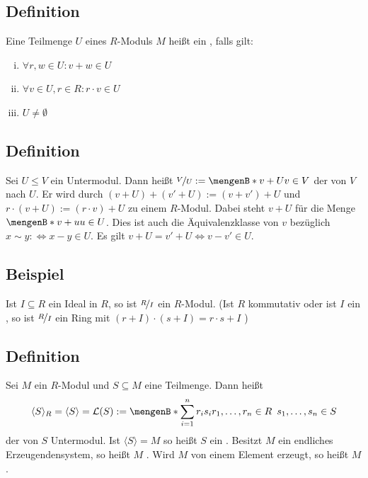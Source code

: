 \subsection[Definition: Untermodul]{Definition} %
\label{sub:143}
Eine Teilmenge $U$ eines $R$-Moduls $M$ heißt ein , falls gilt:
\begin{enumerate}[(i)]
	\item $\forall r,w \in U : v+w \in U$
	\item $\forall v \in U, r \in R : r \cdot v \in U$
	\item $U \not= \emptyset$
\end{enumerate} 

\subsection[Definition: Quotientenmodul]{Definition} %
\label{sub:144}
Sei $U \le V$ ein Untermodul. Dann heißt $\nicefrac{V}{U} := \set[v+U]{v \in V} $ der  von $V$ nach $U$. Er wird durch 
$(v+U)+ (v'+U) := (v+v')+U$ und $r \cdot (v +U) := (r \cdot v) +U$ zu einem $R$-Modul. Dabei steht $v+U$ für die Menge $ \set[v+u]{u \in U} $. Dies ist auch die Äquivalenzklasse von $v$
bezüglich $x \sim y :\Leftrightarrow x-y \in U$. Es gilt $v+U = v' +U \iff v-v' \in U$.

\subsection{Beispiel} %
\label{sub:145}
Ist $I \subseteq R$ ein Ideal in $R$, so ist $\nicefrac{R}{I}$ ein $R$-Modul. (Ist $R$ kommutativ oder ist $I$ ein , so ist $\nicefrac{R}{I}$
ein Ring mit $(r+I)\cdot (s +I) = r \cdot s +I$ )

\subsection[Definition: Erzeugendensystem von Moduln]{Definition} %
\label{sub:146}
Sei $M$ ein $R$-Modul und $S \subseteq M$ eine Teilmenge. Dann heißt 
\[
	\langle S\rangle_R = \langle S\rangle = \mathcal{L} (S) := \set[\sum_{i=1}^{n} r_i s_i]{r_1, \ldots , r_n \in R \enspace s_1, \ldots , s_n \in S} 
\]
der von $S$  Untermodul. Ist $\langle S \rangle = M$ so heißt $S$ ein . Besitzt $M$ ein endliches Erzeugendensystem, so heißt
$M$ . Wird $M$ von einem Element erzeugt, so heißt $M$ . 

